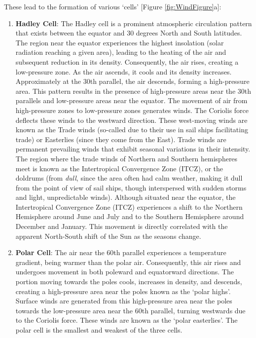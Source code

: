 \documentclass[
  12 pt,
]{Nemilov}
\begin{document}
These lead to the formation of various `cells' {[}Figure \ref{fig:WindFigure}a{]}:

\begin{enumerate}
\def\labelenumi{\arabic{enumi}.}
\item
  \textbf{Hadley Cell}: The Hadley cell is a prominent atmospheric circulation pattern that exists between the equator and 30 degrees North and South latitudes. The region near the equator experiences the highest insolation (solar radiation reaching a given area), leading to the heating of the air and subsequent reduction in its density. Consequently, the air rises, creating a low-pressure zone. As the air ascends, it cools and its density increases. Approximately at the 30th parallel, the air descends, forming a high-pressure area. This pattern results in the presence of high-pressure areas near the 30th parallels and low-pressure areas near the equator. The movement of air from high-pressure zones to low-pressure zones generates winds. The Coriolis force deflects these winds to the westward direction. These west-moving winds are known as the Trade winds (so-called due to their use in sail ships facilitating trade) or Easterlies (since they come from the East). Trade winds are permanent prevailing winds that exhibit seasonal variations in their intensity. The region where the trade winds of Northern and Southern hemispheres meet is known as the Intertropical Convergence Zone (ITCZ), or the doldrums (from \textit{dull}, since the area often had calm weather, making it dull from the point of view of sail ships, though interspersed with sudden storms and light, unpredictable winds). Although situated near the equator, the Intertropical Convergence Zone (ITCZ) experiences a shift to the Northern Hemisphere around June and July and to the Southern Hemisphere around December and January. This movement is directly correlated with the apparent North-South shift of the Sun as the seasons change.
\item
  \textbf{Polar Cell}: The air near the 60th parallel experiences a temperature gradient, being warmer than the polar air. Consequently, this air rises and undergoes movement in both poleward and equatorward directions. The portion moving towards the poles cools, increases in density, and descends, creating a high-pressure area near the poles known as the `polar highs'. Surface winds are generated from this high-pressure area near the poles towards the low-pressure area near the 60th parallel, turning westwards due to the Coriolis force. These winds are known as the `polar easterlies'. The polar cell is the smallest and weakest of the three cells.

\end{enumerate}
\end{document}
